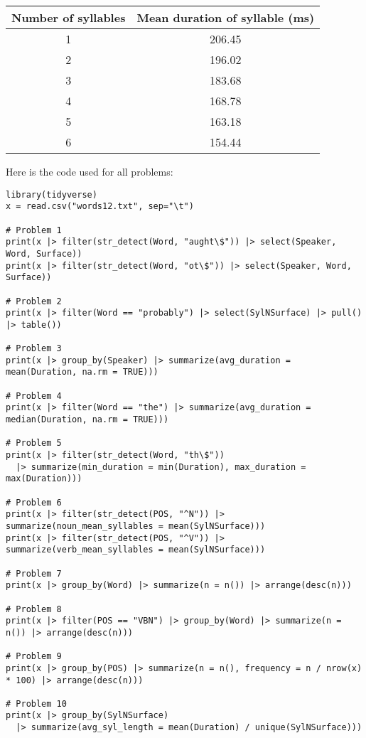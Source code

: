 \documentclass{../../templates/lkx_pset}
\begin{document}
\begin{solution}
	\begin{center}
		\begin{tabular}{|c|c|}
		  \hline
		  Number of syllables & Mean duration of syllable (ms)\\
		  \hline
		  1 & 206.45\\
		  \hline
		  2 & 196.02\\
		  \hline
		  3 & 183.68\\
		  \hline
		  4 & 168.78\\
		  \hline
		  5 & 163.18\\
		  \hline
		  6 & 154.44\\
		  \hline
		\end{tabular}
	\end{center}
\end{solution}

Here is the code used for all problems:
\begin{verbatim}
library(tidyverse)
x = read.csv("words12.txt", sep="\t")

# Problem 1
print(x |> filter(str_detect(Word, "aught\$")) |> select(Speaker, Word, Surface))
print(x |> filter(str_detect(Word, "ot\$")) |> select(Speaker, Word, Surface))

# Problem 2
print(x |> filter(Word == "probably") |> select(SylNSurface) |> pull() |> table())

# Problem 3
print(x |> group_by(Speaker) |> summarize(avg_duration = mean(Duration, na.rm = TRUE)))

# Problem 4
print(x |> filter(Word == "the") |> summarize(avg_duration = median(Duration, na.rm = TRUE)))

# Problem 5
print(x |> filter(str_detect(Word, "th\$")) 
  |> summarize(min_duration = min(Duration), max_duration = max(Duration)))

# Problem 6
print(x |> filter(str_detect(POS, "^N")) |> summarize(noun_mean_syllables = mean(SylNSurface)))
print(x |> filter(str_detect(POS, "^V")) |> summarize(verb_mean_syllables = mean(SylNSurface)))

# Problem 7
print(x |> group_by(Word) |> summarize(n = n()) |> arrange(desc(n)))

# Problem 8
print(x |> filter(POS == "VBN") |> group_by(Word) |> summarize(n = n()) |> arrange(desc(n)))

# Problem 9
print(x |> group_by(POS) |> summarize(n = n(), frequency = n / nrow(x) * 100) |> arrange(desc(n)))

# Problem 10
print(x |> group_by(SylNSurface) 
  |> summarize(avg_syl_length = mean(Duration) / unique(SylNSurface)))
\end{verbatim}
\end{document}
